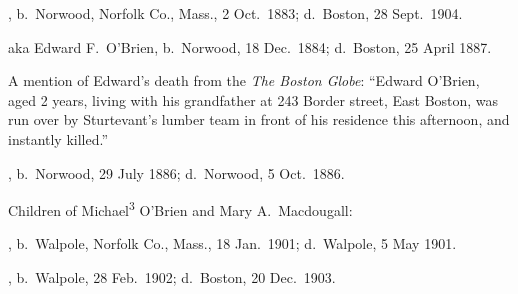 \begin{Kids}
	
	, b.\ Norwood, Norfolk Co., Mass., 2 Oct.\ 1883;\cite{Arthur4OBrienBirth} d.\ Boston, 28 Sept.\ 1904.\cite{Arthur4OBrienDeath}
	
	 aka Edward F.\ O'Brien, b.\ Norwood, 18 Dec.\ 1884;\cite{Edward4OBrien2Birth} d.\ Boston, 25 April 1887.\cite{Edward4OBrien2Death}
	
	\begin{KidsMoreText}
		A mention of Edward's death from the \textit{The Boston Globe}: ``Edward O'Brien, aged 2 years, living with his grandfather at 243 Border street, East Boston, was run over by Sturtevant's lumber team in front of his residence this afternoon, and instantly killed.''\cite{Edward4OBrien2Death2}
	\end{KidsMoreText}
	
	, b.\ Norwood, 29 July 1886;\cite{Elizabeth4OBrienBirth} d.\ Norwood, 5 Oct.\ 1886.\cite{Elizabeth4OBrienDeath}
	
\end{Kids}

\begin{KidsIntro}
	Children of Michael\textsuperscript{3} O'Brien and Mary A.\ Macdougall:
\end{KidsIntro}

\begin{Kids}
	, b.\ Walpole, Norfolk Co., Mass., 18 Jan.\ 1901;\cite{Frances4OBrien1Birth} d.\ Walpole, 5 May 1901.\cite{Frances4OBrien1Death}
	
	, b.\ Walpole, 28 Feb.\ 1902;\cite{Frances4OBrien2Death:1} 
	d.\ Boston, 20 Dec.\ 1903.\cite{Frances4OBrien2Death:2}
\end{Kids}